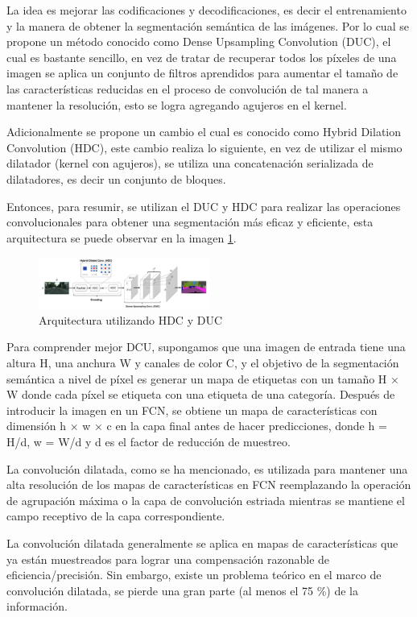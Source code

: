 \documentclass[conference,compsoc]{IEEEtran}
\begin{document}
La idea es mejorar las codificaciones y decodificaciones, es decir el entrenamiento y la manera de obtener la segmentación semántica de las imágenes. Por lo cual se propone un método conocido como Dense Upsampling Convolution (DUC), el cual es bastante sencillo, en vez de tratar de recuperar todos los píxeles de una imagen se aplica un conjunto de filtros aprendidos para aumentar el tamaño de las características reducidas en el proceso de convolución de tal manera a mantener la resolución, esto se logra agregando agujeros en el kernel.

Adicionalmente se propone un cambio el cual es conocido como Hybrid Dilation Convolution (HDC), este cambio realiza lo siguiente, en vez de utilizar el mismo dilatador (kernel con agujeros), se utiliza una concatenación serializada de dilatadores, es decir un conjunto de bloques.

Entonces, para resumir, se utilizan el DUC y HDC para realizar las operaciones convolucionales para obtener una segmentación más eficaz y eficiente, esta arquitectura se puede observar en la imagen \ref{fig:fcn}.

\begin{figure}[H]
\centering
\includegraphics[width=0.5\textwidth]{fcn.png}
\caption{\label{fig:fcn}Arquitectura utilizando HDC y DUC}
\end{figure}

Para comprender mejor DCU, supongamos que una imagen de entrada tiene una altura H, una anchura W y canales de color C, y el objetivo de la segmentación semántica a nivel de píxel es generar un mapa de etiquetas con un tamaño H × W donde cada píxel se etiqueta con una etiqueta de una categoría. Después de introducir la imagen en un FCN, se obtiene un mapa de características con dimensión h × w × c en la capa final antes de hacer predicciones, donde h = H/d, w = W/d y d es el factor de reducción de muestreo.

La convolución dilatada, como se ha mencionado, es utilizada para mantener una alta resolución de los mapas de características en FCN reemplazando la operación de agrupación máxima o la capa de convolución estriada mientras se mantiene el campo receptivo de la capa correspondiente.

La convolución dilatada generalmente se aplica en mapas de características que ya están muestreados para lograr una compensación razonable de eficiencia/precisión.
Sin embargo, existe un problema teórico en el marco de convolución dilatada, se pierde una gran parte (al menos el 75 \%) de la información\cite{segconv}.
\end{document}
